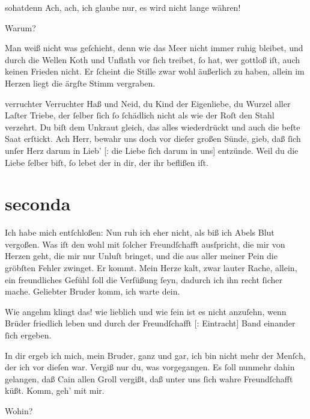 \documentclass[tocstyle=ref-genre]{ees}
\begin{document}
{\begin{movement}{sohatdenn}
  \voice[Adam]
  Ach, ach, ich glaube nur, es wird nicht lange währen!

  \voice[Eva]
  Warum?

  \voice[Adam]
  Man weiß nicht was geſchieht,
  denn wie das Meer nicht immer ruhig bleibet,
  und durch die Wellen Koth und Unflath vor ſich treibet,
  ſo hat, wer gottloß iſt, auch keinen Frieden nicht.
  Er ſcheint die Stille zwar wohl äußerlich zu haben,
  allein im Herzen liegt die ärgſte Stimm vergraben.
\end{movement}

\begin{movement}{verruchter}
  \voice[Chor]
  Verruchter Haß und Neid, du Kind der Eigenliebe,
  du Wurzel aller Laſter Triebe,
  der ſelber ſich ſo ſchädlich nicht
  als wie der Roſt den Stahl verzehrt.
  Du biſt dem Unkraut gleich, das alles wiederdrückt
  und auch die beſte Saat erſtickt.
  Ach Herr, bewahr uns doch vor dieſer großen Sünde,
  gieb, daß ſich unſer Herz darum in Lieb’ [: die Liebe ſich darum in uns] entzünde.
  Weil du die Liebe ſelber biſt,
  ſo lebet der in dir, der ihr beflißen iſt.
\end{movement}

\part{seconda}

\begin{movement}{}
  \voice[Cain]
  Ich habe mich entſchloßen:
  Nun ruh ich eher nicht,
  als biß ich Abels Blut vergoßen.
  Was iſt den wohl mit ſolcher Freundſchafft ausſpricht,
  die mir von Herzen geht, die mir nur Unluſt bringet,
  und die aus aller meiner Pein
  die gröbſten Fehler zwinget.
  Er kommt. Mein Herze kalt, zwar lauter Rache,
  allein,
  ein freundliches Gefühl ſoll die Verſüßung ſeyn,
  dadurch ich ihn recht ſicher mache.
  Geliebter Bruder komm, ich warte dein.

  \voice[Abel]
  Wie angehm klingt das! wie lieblich und wie fein
  ist es nicht anzuſehn, wenn Brüder friedlich leben
  und durch der Freundſchafft [: Eintracht] Band einander ſich ergeben.

  \voice[Cain]
  In dir ergeb ich mich, mein Bruder, ganz und gar,
  ich bin nicht mehr der Menſch, der ich vor dieſen war.
  Vergiß nur du, was vorgegangen.
  Es ſoll nunmehr dahin gelangen,
  daß Cain allen Groll vergißt,
  daß unter uns ſich wahre Freundſchafft küßt.
  Komm, geh’ mit mir.

  \voice[Abel]
  Wohin?


\end{movement}}
\end{document}
